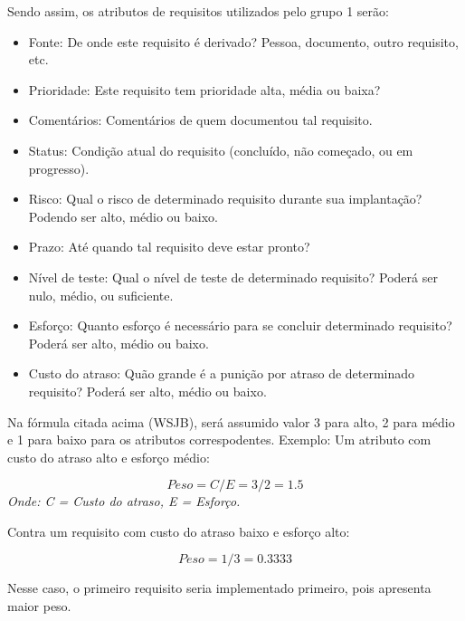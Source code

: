 Sendo assim, os atributos de requisitos utilizados pelo grupo 1 serão:
\begin{itemize}
  \item Fonte: De onde este requisito é derivado? Pessoa, documento, outro requisito, etc.
  \item Prioridade: Este requisito tem prioridade alta, média ou baixa?
  \item Comentários: Comentários de quem documentou tal requisito.
  \item Status: Condição atual do requisito (concluído, não começado, ou em progresso).
  \item Risco: Qual o risco de determinado requisito durante sua implantação? Podendo ser alto, médio ou baixo.
  \item Prazo: Até quando tal requisito deve estar pronto?
  \item Nível de teste: Qual o nível de teste de determinado requisito? Poderá ser nulo, médio, ou suficiente.
  \item Esforço: Quanto esforço é necessário para se concluir determinado requisito? Poderá ser alto, médio ou baixo.
  \item Custo do atraso: Quão grande é a punição por atraso de determinado requisito? Poderá ser alto, médio ou baixo.
\end{itemize}

Na fórmula citada acima (WSJB), será assumido valor 3 para alto, 2 para médio e 1 para baixo para os atributos correspodentes. Exemplo: Um atributo com custo do atraso alto e esforço médio:

\begin{equation}
  Peso = C / E = 3/2 = 1.5
\end{equation}
  \emph{Onde: C = Custo do atraso, E = Esforço.}

Contra um requisito com custo do atraso baixo e esforço alto:

\begin{equation}
  Peso = 1/3 = 0.3333
\end{equation}

Nesse caso, o primeiro requisito seria implementado primeiro, pois apresenta maior peso.
